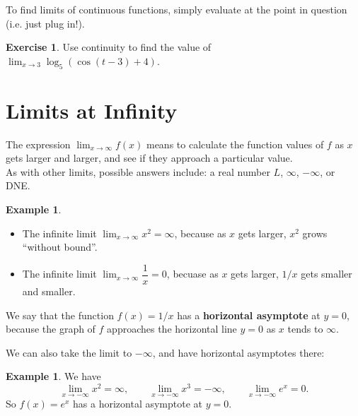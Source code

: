 \documentclass[11pt,reqno,final]{amsart}
\numberwithin{equation}{section}
\numberwithin{figure}{section}
\theoremstyle{definition} %
\newtheorem{example}[equation]{Example}%
\newtheorem{exercise}[question]{Exercise}
\newcommand{\dlim}{\displaystyle\lim}
\begin{document}
\noindent To find limits of continuous functions, simply evaluate at the point in question (i.e. just plug in!).

\begin{exercise}
        Use continuity to find the value of $\dlim_{x \to 3} \log_5(\cos(t-3)+4)$.
        \vfill
\end{exercise}

\section{Limits at Infinity}

The expression $\dlim_{x \to \infty} f(x)$ means to calculate the function values of $f$ as $x$ gets larger and larger, and see if they approach a particular value. \\
As with other limits, possible answers include: a real number $L$, $\infty$, $-\infty$, or DNE.
\begin{example}
        $ $
        \begin{itemize}
        \item The infinite limit $\dlim_{x \to \infty}x^2 = \infty$, because as $x$ gets larger, $x^2$ grows ``without bound''.\\
        \item The infinite limit $\dlim_{x \to \infty} \dfrac{1}{x} = 0$, becuase as $x$ gets larger, $1/x$ gets smaller and smaller.
        \end{itemize}
\end{example}

We say that the function $f(x) = 1/x$ has a \textbf{horizontal asymptote} at $y = 0$, because the graph of $f$ approaches the horizontal line $y = 0$ as $x$ tends to $\infty$.

We can also take the limit to $-\infty$, and have horizontal asymptotes there:
\begin{example}
        We have
        \[
                \dlim_{x \to -\infty} x^2 = \infty,
                \qquad
                \dlim_{x \to -\infty} x^3 = -\infty,
                \qquad
                \dlim_{x \to -\infty} e^x = 0.
        \]
        So $f(x) = e^x$ has a horizontal asymptote at $y = 0$.
\end{example}

\newpage
\end{document}
